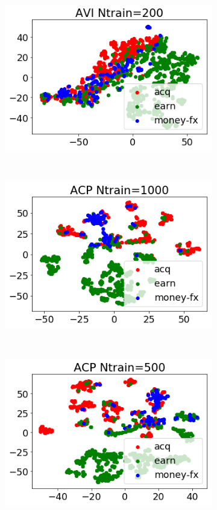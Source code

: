 \documentclass[twoside]{article}
\begin{document}
\begin{figure}
\begin{subfigure}[t]{0.33\textwidth}
        \includegraphics[width=1.0\linewidth]{reuters_avi200_h150.png}
        \label{fig: reuters_h150_avi_200}
    \end{subfigure}
    ~
    \begin{subfigure}[t]{0.33\textwidth}
        \centering
        \includegraphics[width=1.0\linewidth]{reuters_acp1000_h150.png}
        \label{fig: reuters_h150_acp_1000}
    \end{subfigure}%
    ~
    \begin{subfigure}[t]{0.33\textwidth}
        \centering
        \includegraphics[width=1.0\linewidth]{reuters_acp500_h150.png}

\end{subfigure}
\end{figure}
\end{document}
